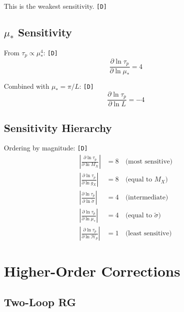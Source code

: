 \documentclass[11pt,a4paper]{article}
\newcommand{\tagD}{\textcolor{green!50!black}{\texttt{[D]}}}
\theoremstyle{definition}
\begin{document}
This is the weakest sensitivity. \tagD{}

\subsection{$\mu_*$ Sensitivity}
\label{app:mustar-sens}

From $\tau_p \propto \mu_*^4$: \tagD{}
\begin{equation}
\label{eq:sens-mustar-1}
\frac{\partial \ln\tau_p}{\partial \ln \mu_*} = 4
\end{equation}

Combined with $\mu_* = \pi/L$: \tagD{}
\begin{equation}
\label{eq:sens-mustar-L}
\frac{\partial \ln\tau_p}{\partial \ln L} = -4
\end{equation}

\subsection{Sensitivity Hierarchy}
\label{app:sens-hierarchy}

Ordering by magnitude: \tagD{}
\begin{align}
\label{eq:sens-hier-1}
\left|\frac{\partial \ln\tau_p}{\partial \ln M_X}\right| &= 8 \quad \text{(most sensitive)} \\
\label{eq:sens-hier-2}
\left|\frac{\partial \ln\tau_p}{\partial \ln g_X}\right| &= 8 \quad \text{(equal to $M_X$)} \\
\label{eq:sens-hier-3}
\left|\frac{\partial \ln\tau_p}{\partial \ln \tilde{\sigma}}\right| &= 4 \quad \text{(intermediate)} \\
\label{eq:sens-hier-4}
\left|\frac{\partial \ln\tau_p}{\partial \ln \mu_*}\right| &= 4 \quad \text{(equal to $\tilde{\sigma}$)} \\
\label{eq:sens-hier-5}
\left|\frac{\partial \ln\tau_p}{\partial \ln \mathcal{H}_p}\right| &= 1 \quad \text{(least sensitive)}
\end{align}

\section{Higher-Order Corrections}
\label{app:higher-order}

\subsection{Two-Loop RG}
\label{app:two-loop}
\end{document}
